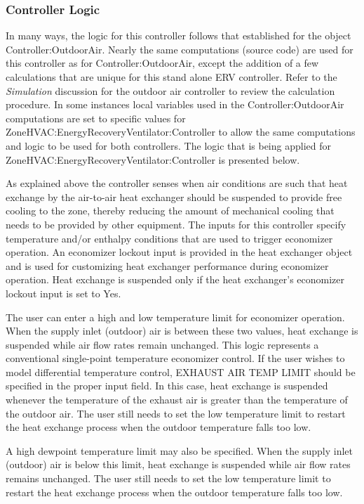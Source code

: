 \subsubsection{Controller Logic}\label{controller-logic}

In many ways, the logic for this controller follows that established for the object Controller:OutdoorAir. Nearly the same computations (source code) are used for this controller as for Controller:OutdoorAir, except the addition of a few calculations that are unique for this stand alone ERV controller. Refer to the \emph{Simulation} discussion for the outdoor air controller to review the calculation procedure. In some instances local variables used in the Controller:OutdoorAir computations are set to specific values for ZoneHVAC:EnergyRecoveryVentilator:Controller to allow the same computations and logic to be used for both controllers. The logic that is being applied for ZoneHVAC:EnergyRecoveryVentilator:Controller is presented below.

As explained above the controller senses when air conditions are such that heat exchange by the air-to-air heat exchanger should be suspended to provide free cooling to the zone, thereby reducing the amount of mechanical cooling that needs to be provided by other equipment. The inputs for this controller specify temperature and/or enthalpy conditions that are used to trigger economizer operation. An economizer lockout input is provided in the heat exchanger object and is used for customizing heat exchanger performance during economizer operation. Heat exchange is suspended only if the heat exchanger's economizer lockout input is set to Yes.

The user can enter a high and low temperature limit for economizer operation. When the supply inlet (outdoor) air is between these two values, heat exchange is suspended while air flow rates remain unchanged. This logic represents a conventional single-point temperature economizer control. If the user wishes to model differential temperature control, EXHAUST AIR TEMP LIMIT should be specified in the proper input field. In this case, heat exchange is suspended whenever the temperature of the exhaust air is greater than the temperature of the outdoor air. The user still needs to set the low temperature limit to restart the heat exchange process when the outdoor temperature falls too low.

A high dewpoint temperature limit may also be specified. When the supply inlet (outdoor) air is below this limit, heat exchange is suspended while air flow rates remains unchanged. The user still needs to set the low temperature limit to restart the heat exchange process when the outdoor temperature falls too low.

